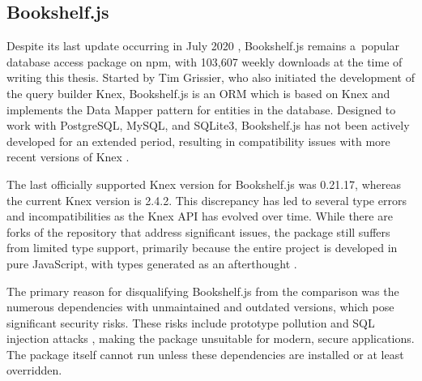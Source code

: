 \subsection{Bookshelf.js}

Despite its last update occurring in July 2020 \cite{bookshelfNpm}, Bookshelf.js
remains a~popular database access package on npm, with 103,607 weekly downloads
at the time of writing this thesis. Started by Tim Grissier, who also initiated
the development of the query builder Knex, Bookshelf.js is an ORM which is based
on Knex and implements the Data Mapper pattern for entities in the database.
Designed to work with PostgreSQL, MySQL, and SQLite3, Bookshelf.js has not been
actively developed for an extended period, resulting in compatibility issues
with more recent versions of Knex \cite{bookshelfGitHub}.

The last officially supported Knex version for Bookshelf.js was 0.21.17, whereas
the current Knex version is 2.4.2. This discrepancy has led to several type
errors and incompatibilities as the Knex API has evolved over time. While there
are forks of the repository that address significant issues, the package still
suffers from limited type support, primarily because the entire project is
developed in pure JavaScript, with types generated as an afterthought
\cite{bookshelfDocs}.

The primary reason for disqualifying Bookshelf.js from the comparison was the
numerous dependencies with unmaintained and outdated versions, which pose
significant security risks. These risks include prototype pollution
\cite{cve-2019-10744} and SQL injection attacks \cite{cve-2016-20018}, making
the package unsuitable for modern, secure applications. The package itself
cannot run unless these dependencies are installed or at least overridden.
